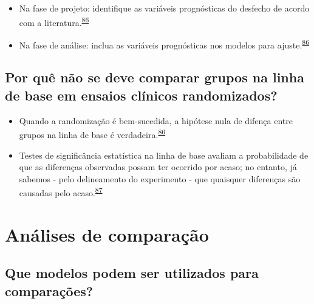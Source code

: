 \documentclass[
]{book}
\begin{document}
\begin{itemize}
\item
  Na fase de projeto: identifique as variáveis prognósticas do desfecho de acordo com a literatura.\textsuperscript{\protect\hyperlink{ref-roberts1999}{86}}
\item
  Na fase de análise: inclua as variáveis prognósticas nos modelos para ajuste.\textsuperscript{\protect\hyperlink{ref-roberts1999}{86}}
\end{itemize}

\hypertarget{por-quuxea-nuxe3o-se-deve-comparar-grupos-na-linha-de-base-em-ensaios-cluxednicos-randomizados}{%
\subsection{Por quê não se deve comparar grupos na linha de base em ensaios clínicos randomizados?}\label{por-quuxea-nuxe3o-se-deve-comparar-grupos-na-linha-de-base-em-ensaios-cluxednicos-randomizados}}

\begin{itemize}
\item
  Quando a randomização é bem-sucedida, a hipótese nula de difença entre grupos na linha de base é verdadeira.\textsuperscript{\protect\hyperlink{ref-roberts1999}{86}}
\item
  Testes de significância estatística na linha de base avaliam a probabilidade de que as diferenças observadas possam ter ocorrido por acaso; no entanto, já sabemos - pelo delineamento do experimento - que quaisquer diferenças são causadas pelo acaso.\textsuperscript{\protect\hyperlink{ref-gruijters2020}{87}}
\end{itemize}

\hypertarget{comparacao-pre-pos}{%
\section{Análises de comparação}\label{comparacao-pre-pos}}

\hypertarget{que-modelos-podem-ser-utilizados-para-comparauxe7uxf5es}{%
\subsection{Que modelos podem ser utilizados para comparações?}\label{que-modelos-podem-ser-utilizados-para-comparauxe7uxf5es}}
\end{document}
